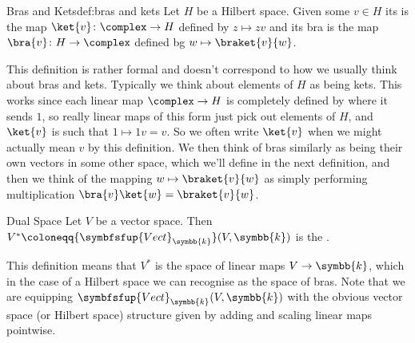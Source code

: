 \documentclass[fleqn]{NotesClass}
\makeatletter
\newcommand{\c@egory}[1]{\symbfsfup{#1}}
\renewcommand{\field}{\symbb{k}}
\newcommand{\Vect}[1][\field]{{\c@egory{Vect}_{#1}}}
\makeatother
\begin{document}
    \begin{dfn}{Bras and Kets}{def:bras and kets}
        Let \(H\) be a Hilbert space.
        Given some \(v \in H\) its  is the map \(\ket{v} \colon \complex \to H\) defined by \(z \mapsto zv\) and its bra is the map \(\bra{v} \colon H \to \complex\) defined bg \(w \mapsto \braket{v}{w}\).
    \end{dfn}
    
    This definition is rather formal and doesn't correspond to how we usually think about bras and kets.
    Typically we think about elements of \(H\) as being kets.
    This works since each linear map \(\complex \to H\) is completely defined by where it sends \(1\), so really linear maps of this form just pick out elements of \(H\), and \(\ket{v}\) is such that \(1 \mapsto 1v = v\).
    So we often write \(\ket{v}\) when we might actually mean \(v\) by this definition.
    We then think of bras similarly as being their own vectors in some other space, which we'll define in the next definition, and then we think of the mapping \(w \mapsto \braket{v}{w}\) as simply performing multiplication \(\bra{v} \ket{w} = \braket{v}{w}\).
    
    \begin{dfn}{Dual Space}{}
        Let \(V\) be a vector space.
        Then \(V^* \coloneqq \Vect(V, \field)\) is the .
    \end{dfn}
    
    This definition means that \(V^*\) is the space of linear maps \(V \to \field\), which in the case of a Hilbert space we can recognise as the space of bras.
    Note that we are equipping \(\Vect(V, \field)\) with the obvious vector space (or Hilbert space) structure given by adding and scaling linear maps pointwise.
    
    
\end{document}
